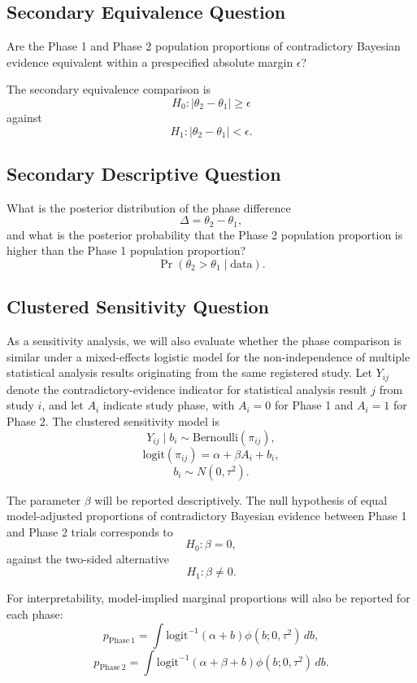 \documentclass[11pt]{article}
\begin{document}
\subsection{Secondary Equivalence Question}

Are the Phase 1 and Phase 2 population proportions of contradictory Bayesian evidence equivalent within a prespecified absolute margin \(\epsilon\)?

The secondary equivalence comparison is
\[
H_0: |\theta_2-\theta_1| \geq \epsilon
\]
against
\[
H_1: |\theta_2-\theta_1| < \epsilon.
\]

\subsection{Secondary Descriptive Question}

What is the posterior distribution of the phase difference
\[
\Delta = \theta_2 - \theta_1,
\]
and what is the posterior probability that the Phase 2 population proportion is higher than the Phase 1 population proportion?
\[
\Pr(\theta_2 > \theta_1 \mid \text{data}).
\]

\subsection{Clustered Sensitivity Question}

As a sensitivity analysis, we will also evaluate whether the phase comparison is similar under a mixed-effects logistic model for the non-independence of multiple statistical analysis results originating from the same registered study. Let \(Y_{ij}\) denote the contradictory-evidence indicator for statistical analysis result \(j\) from study \(i\), and let \(A_i\) indicate study phase, with \(A_i=0\) for Phase 1 and \(A_i=1\) for Phase 2. The clustered sensitivity model is
\[
Y_{ij} \mid b_i \sim \mathrm{Bernoulli}(\pi_{ij}),
\]
\[
\mathrm{logit}(\pi_{ij}) = \alpha + \beta A_i + b_i,
\]
\[
b_i \sim N(0,\tau^2).
\]

The parameter \(\beta\) will be reported descriptively. The null hypothesis of equal model-adjusted proportions of contradictory Bayesian evidence between Phase 1 and Phase 2 trials corresponds to
\[
H_0: \beta = 0,
\]
against the two-sided alternative
\[
H_1: \beta \neq 0.
\]

For interpretability, model-implied marginal proportions will also be reported for each phase:
\[
p_{\mathrm{Phase\ 1}} =
\int \mathrm{logit}^{-1}(\alpha + b)\phi(b;0,\tau^2)\,db,
\]
\[
p_{\mathrm{Phase\ 2}} =
\int \mathrm{logit}^{-1}(\alpha + \beta + b)\phi(b;0,\tau^2)\,db.
\]
\end{document}
